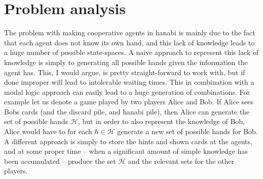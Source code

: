 \section{Problem analysis}

The problem with making cooperative agents in hanabi is mainly due to the fact that each agent does not know its own hand, and this lack of knowledge leads to a huge number of possible state-spaces. 
A naive approach to represent this lack of knowledge is simply to generating all possible hands given the information the agent has.
This, I would argue, is pretty straight-forward to work with, but if done improper will lead to intolerable waiting times.
This in combination with a modal logic approach can easily lead to a huge generation of combinations. 
For example let us denote a game played by two players Alice and Bob. 
If Alice sees Bobs cards (and the discard pile, and hanabi pile), then Alice can generate the set of possible hands $\mathcal{H}$, but in order to also represent the knowledge of Bob, Alice would have to for each $h \in \mathcal{H}$ generate a new set of possible hands for Bob.
A different approach is simply to store the hints and shown cards at the agents, and at some proper time -- when a significant amount of simple knowledge has been accumulated -- produce the set $\mathcal{H}$ and the relevant sets for the other players.


